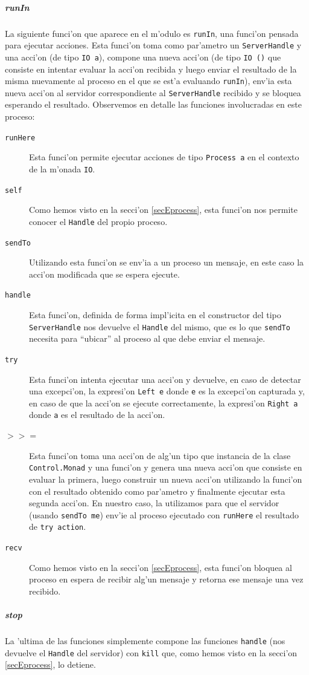 \documentclass[a4paper]{article}
\begin{document}
\subparagraph{runIn} La siguiente funci'on que aparece en el m'odulo es \texttt{runIn}, una funci'on pensada para ejecutar acciones.  Esta funci'on toma como par'ametro un \texttt{ServerHandle} y una acci'on (de tipo \texttt{IO a}), compone una nueva acci'on (de tipo \texttt{IO ()} que consiste en intentar evaluar la acci'on recibida y luego enviar el resultado de la misma nuevamente al proceso en el que se est'a evaluando \texttt{runIn}), env'ia esta nueva acci'on al servidor correspondiente al \texttt{ServerHandle} recibido y se bloquea esperando el resultado.  Observemos en detalle las funciones involucradas en este proceso:
\begin{description}
	\item[\texttt{runHere}] Esta funci'on permite ejecutar acciones de tipo \texttt{Process a} en el contexto de la m'onada \texttt{IO}.
	\item[\texttt{self}] Como hemos visto en la secci'on \ref{secEprocess}, esta funci'on nos permite conocer el \texttt{Handle} del propio proceso.
	\item[\texttt{sendTo}] Utilizando esta funci'on se env'ia a un proceso un mensaje, en este caso la acci'on modificada que se espera ejecute.
	\item[\texttt{handle}] Esta funci'on, definida de forma impl'icita en el constructor del tipo \texttt{ServerHandle} nos devuelve el \texttt{Handle} del mismo, que es lo que \texttt{sendTo} necesita para ``ubicar'' al proceso al que debe enviar el mensaje.
	\item[\texttt{try}] Esta funci'on intenta ejecutar una acci'on y devuelve, en caso de detectar una excepci'on, la expresi'on \texttt{Left e} donde \texttt{e} es la excepci'on capturada y, en caso de que la acci'on se ejecute correctamente, la expresi'on \texttt{Right a} donde \texttt{a} es el resultado de la acci'on.
	\item[\texttt{$>>=$}] Esta funci'on toma una acci'on de alg'un tipo que instancia de la clase \texttt{Control.Monad} y una funci'on y genera una nueva acci'on que consiste en evaluar la primera, luego construir un nueva acci'on utilizando la funci'on con el resultado obtenido como par'ametro y finalmente ejecutar esta segunda acci'on.  En nuestro caso, la utilizamos para que el servidor (usando \texttt{sendTo me}) env'ie al proceso ejecutado con \texttt{runHere} el resultado de \texttt{try action}.
	\item[\texttt{recv}] Como hemos visto en la secci'on \ref{secEprocess}, esta funci'on bloquea al proceso en espera de recibir alg'un mensaje y retorna ese mensaje una vez recibido.
\end{description}
\subparagraph{stop} La 'ultima de las funciones simplemente compone las funciones \texttt{handle} (nos devuelve el \texttt{Handle} del servidor) con \texttt{kill} que, como hemos visto en la secci'on \ref{secEprocess}, lo detiene.
\end{document}
